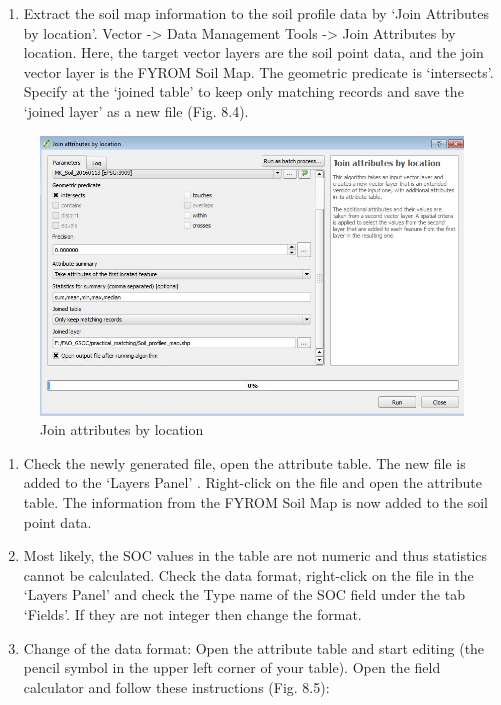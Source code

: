 \documentclass[10pt,b5paper,]{book}
\providecommand{\tightlist}{%
  \setlength{\itemsep}{0pt}\setlength{\parskip}{0pt}}
\theoremstyle{definition}
\theoremstyle{definition}
\theoremstyle{definition}
\theoremstyle{remark}
\begin{document}
\begin{enumerate}
\def\labelenumi{\arabic{enumi}.}
\tightlist
\item
  Extract the soil map information to the soil profile data by `Join
  Attributes by location'. Vector -\textgreater{} Data Management Tools
  -\textgreater{} Join Attributes by location. Here, the target vector
  layers are the soil point data, and the join vector layer is the FYROM
  Soil Map. The geometric predicate is `intersects'. Specify at the
  `joined table' to keep only matching records and save the `joined
  layer' as a new file (Fig. 8.4).
\end{enumerate}

\begin{figure}

{\centering \includegraphics[width=0.8\linewidth]{images/Conv_upscaling4} 

}

\caption{Join attributes by location}\label{fig:unnamed-chunk-26}
\end{figure}

\begin{enumerate}
\def\labelenumi{\arabic{enumi}.}
\setcounter{enumi}{1}
\tightlist
\item
  Check the newly generated file, open the attribute table. The new file
  is added to the `Layers Panel' . Right-click on the file and open the
  attribute table. The information from the FYROM Soil Map is now added
  to the soil point data.
\item
  Most likely, the SOC values in the table are not numeric and thus
  statistics cannot be calculated. Check the data format, right-click on
  the file in the `Layers Panel' and check the Type name of the SOC
  field under the tab `Fields'. If they are not integer then change the
  format.
\item
  Change of the data format: Open the attribute table and start editing
  (the pencil symbol in the upper left corner of your table). Open the
  field calculator and follow these instructions (Fig. 8.5):
\end{enumerate}
\end{document}
